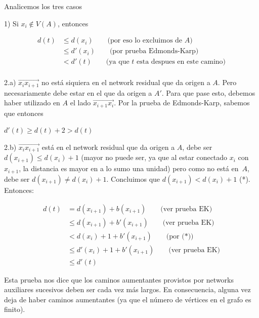 \documentclass[10pt,a4paper]{article}
\begin{document}
Analicemos los tres casos

1) Si $x_i\not\in V(A)$, entonces

\begin{center}
\begin{align*}
d(t) &\leq d(x_i)\quad\quad\text{(por eso lo excluimos de } A\text{)}\\
&\leq d'(x_i)\quad\quad \text{(por prueba Edmonds-Karp)}\\
&< d'(t) \quad\quad\text{(ya que }t\text{ esta despues en este camino)}\\
\end{align*}
\end{center}

2.a) $\overrightarrow{x_ix_{i+1}}$ no está siquiera en el network residual que da origen a $A$. Pero necesariamente debe estar en el que da origen a $A'$. Para que pase esto, debemos haber utilizado en $A$ el lado $\overrightarrow{x_{i+1}x_{i}}$. Por la prueba de Edmonds-Karp, sabemos que entonces

\begin{center}
$d'(t) \geq d(t) + 2 > d(t)$
\end{center}

2.b) $\overrightarrow{x_ix_{i+1}}$ está en el network residual que da origen a $A$, debe ser $d(x_{i+1})\leq d(x_i) + 1$ (mayor no puede ser, ya que al estar conectado $x_{i}$ con $x_{i+1}$, la distancia es mayor en a lo sumo una unidad) pero como no está en $A$, debe ser $d(x_{i+1})\neq d(x_i) + 1$. Concluimos que $d(x_{i+1})< d(x_i) + 1$ (*). Entonces:

\begin{center}
\begin{align*}
d(t) &= d(x_{i+1}) + b(x_{i+1})\quad \quad \text{(ver prueba EK)}\\
&\leq d(x_{i+1})+b'(x_{i+1})\quad \quad \text{(ver prueba EK)}\\
&< d(x_i)+1+b'(x_{i+1})\quad \quad \text{(por (*))}\\
&\leq d'(x_i)+1+b'(x_{i+1})\quad \quad \text{(ver prueba EK)}\\
&\leq d'(t)
\end{align*}
\end{center}

Esta prueba nos dice que los caminos aumentantes provistos por networks auxiliares sucesivos deben ser cada vez más largos. En consecuencia, alguna vez deja de haber caminos aumentantes (ya que el número de vértices en el grafo es finito).
\end{document}

